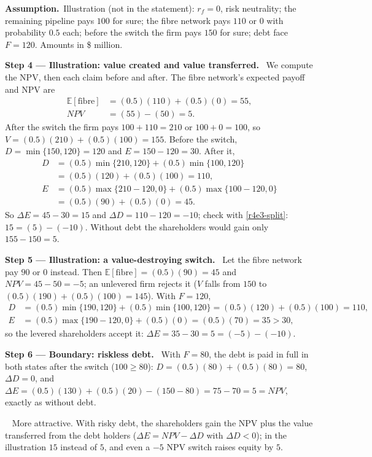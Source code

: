 \documentclass[11pt,a4paper]{article}
\newcommand{\step}[2]{\par\medskip\noindent\textbf{Step #1 --- #2.}~}
\newcommand{\assume}{\par\smallskip\noindent\textbf{Assumption.}~}
\newcommand{\answer}[1]{\par\smallskip\noindent\fbox{\textbf{Answer #1.}}~}
\begin{document}
\assume Illustration (not in the statement): $r_f=0$, risk neutrality; the remaining pipeline
pays $100$ for sure; the fibre network pays $110$ or $0$ with probability $0.5$ each; before the
switch the firm pays $150$ for sure; debt face $F=120$. Amounts in \$ million.

\step{4}{Illustration: value created and value transferred} We compute the NPV, then each
claim before and after. The fibre network's expected payoff and NPV are
\begin{align}
  \mathbb{E}[\text{fibre}] &= (0.5)(110)+(0.5)(0) = 55, \nonumber\\
  \mathit{NPV} &= (55)-(50) = 5. \nonumber
\end{align}
After the switch the firm pays $100+110=210$ or $100+0=100$, so $V=(0.5)(210)+(0.5)(100)=155$.
Before the switch, $D=\min\{150,120\}=120$ and $E=150-120=30$. After it,
\begin{align}
  D &= (0.5)\min\{210,120\}+(0.5)\min\{100,120\} \nonumber\\
    &= (0.5)(120)+(0.5)(100) = 110, \nonumber\\
  E &= (0.5)\max\{210-120,0\}+(0.5)\max\{100-120,0\} \nonumber\\
    &= (0.5)(90)+(0.5)(0) = 45. \nonumber
\end{align}
So $\Delta E=45-30=15$ and $\Delta D=110-120=-10$; check with \eqref{r4e3-split}:
$15=(5)-(-10)$. Without debt the shareholders would gain only $155-150=5$.

\step{5}{Illustration: a value-destroying switch} Let the fibre network pay $90$ or $0$ instead.
Then $\mathbb{E}[\text{fibre}]=(0.5)(90)=45$ and $\mathit{NPV}=45-50=-5$; an unlevered firm
rejects it ($V$ falls from $150$ to $(0.5)(190)+(0.5)(100)=145$). With $F=120$,
\begin{align}
  D &= (0.5)\min\{190,120\}+(0.5)\min\{100,120\} = (0.5)(120)+(0.5)(100) = 110, \nonumber\\
  E &= (0.5)\max\{190-120,0\}+(0.5)(0) = (0.5)(70) = 35 > 30, \nonumber
\end{align}
so the levered shareholders accept it: $\Delta E=35-30=5=(-5)-(-10)$.

\step{6}{Boundary: riskless debt} With $F=80$, the debt is paid in full in both states after
the switch ($100\ge 80$): $D=(0.5)(80)+(0.5)(80)=80$, $\Delta D=0$, and
$\Delta E=(0.5)(130)+(0.5)(20)-(150-80)=75-70=5=\mathit{NPV}$, exactly as without debt.

\answer{} More attractive. With risky debt, the shareholders gain the NPV plus the value
transferred from the debt holders ($\Delta E=\mathit{NPV}-\Delta D$ with $\Delta D<0$); in the
illustration $15$ instead of $5$, and even a $-5$ NPV switch raises equity by $5$.
\end{document}
